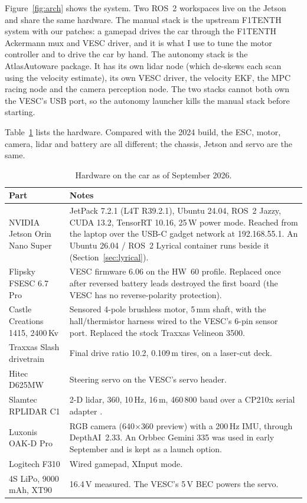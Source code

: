 \documentclass[12pt]{article}
\begin{document}
Figure~\ref{fig:arch} shows the system. Two ROS~2 workspaces live on the Jetson and
share the same hardware. The manual stack is the upstream F1TENTH system with our
patches: a gamepad drives the car through the F1TENTH Ackermann mux and VESC driver,
and it is what I use to tune the motor controller and to drive the car by hand. The
autonomy stack is the AtlasAutoware package. It has its own lidar node (which de-skews
each scan using the velocity estimate), its own VESC driver, the velocity EKF, the MPC
racing node and the camera perception node. The two stacks cannot both own the VESC's
USB port, so the autonomy launcher kills the manual stack before starting.

Table~\ref{tab:parts} lists the hardware. Compared with the 2024 build, the ESC, motor,
camera, lidar and battery are all different; the chassis, Jetson and servo are the same.

\begin{table}[H]
  \centering
  \small
  \begin{tabular}{p{4.3cm} p{10.2cm}}
    \toprule
    Part & Notes \\
    \midrule
    NVIDIA Jetson Orin Nano Super & JetPack 7.2.1 (L4T R39.2.1), Ubuntu 24.04, ROS~2 Jazzy,
      CUDA 13.2, TensorRT 10.16, 25\,W power mode. Reached from the laptop over the USB-C
      gadget network at 192.168.55.1. An Ubuntu 26.04 / ROS~2 Lyrical container runs beside it
      (Section~\ref{sec:lyrical}). \\
    Flipsky FSESC 6.7 Pro & VESC firmware 6.06 on the HW~60 profile. Replaced once after
      reversed battery leads destroyed the first board (the VESC has no reverse-polarity
      protection). \\
    Castle Creations 1415, 2400\,Kv & Sensored 4-pole brushless motor, 5\,mm shaft, with the
      hall/thermistor harness wired to the VESC's 6-pin sensor port. Replaced the stock
      Traxxas Velineon 3500. \\
    Traxxas Slash drivetrain & Final drive ratio 10.2, 0.109\,m tires, on a laser-cut deck. \\
    Hitec D625MW & Steering servo on the VESC's servo header. \\
    Slamtec RPLIDAR C1 & 2-D lidar, 360\textdegree{}, 10\,Hz, 16\,m, 460\,800 baud over a
      CP210x serial adapter \cite{rplidarc1}. \\
    Luxonis OAK-D Pro & RGB camera (640$\times$360 preview) with a 200\,Hz IMU, through DepthAI~2.33.
      An Orbbec Gemini 335 \cite{gemini335} was used in early September and is kept as a launch
      option. \\
    Logitech F310 & Wired gamepad, XInput mode. \\
    4S LiPo, 9000\,mAh, XT90 & 16.4\,V measured. The VESC's 5\,V BEC powers the servo. \\
    \bottomrule
  \end{tabular}
  \caption{Hardware on the car as of September 2026.}
  \label{tab:parts}
\end{table}
\end{document}
